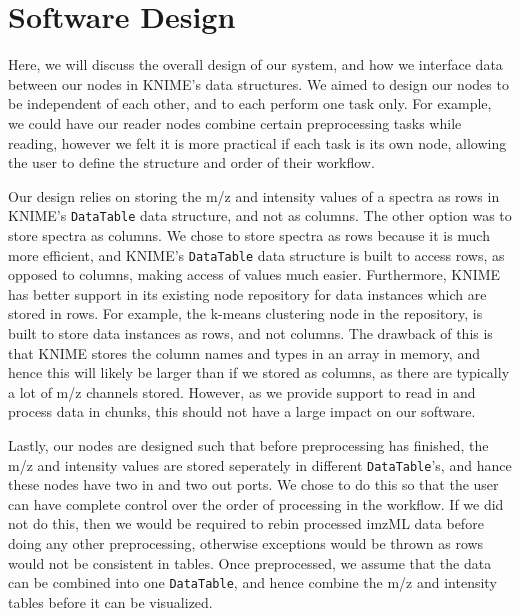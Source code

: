 \documentclass[11pt,openany]{book}
\begin{document}
\section{Software Design}
Here, we will discuss the overall design of our system, and how we interface data between our nodes in KNIME's data structures. We aimed to design our nodes to be independent of each other, and to each perform one task only. For example, we could have our reader nodes combine certain preprocessing tasks while reading, however we felt it is more practical if each task is its own node, allowing the user to define the structure and order of their workflow. 

Our design relies on storing the m/z and intensity values of a spectra as rows in KNIME's \texttt{DataTable} data structure, and not as columns. The other option was to store spectra as columns. We chose to store spectra as rows because it is much more efficient, and KNIME's \texttt{DataTable} data structure is built to access rows, as opposed to columns, making access of values much easier. Furthermore, KNIME has better support in its existing node repository for data instances which are stored in rows. For example, the k-means clustering node in the repository, is built to store data instances as rows, and not columns. The drawback of this is that KNIME stores the column names and types in an array in memory, and hence this will likely be larger than if we stored as columns, as there are typically a lot of m/z channels stored. However, as we provide support to read in and process data in chunks, this should not have a large impact on our software.

Lastly, our nodes are designed such that before preprocessing has finished, the m/z and intensity values are stored seperately in different \texttt{DataTable}'s, and hance these nodes have two in and two out ports. We chose to do this so that the user can have complete control over the order of processing in the workflow. If we did not do this, then we would be required to rebin processed imzML data before doing any other preprocessing, otherwise exceptions would be thrown as rows would not be consistent in tables. Once preprocessed, we assume that the data can be combined into one \texttt{DataTable}, and hence combine the m/z and intensity tables before it can be visualized.
\end{document}
